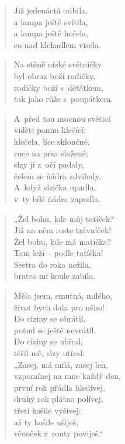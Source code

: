 \begin{verse}
Již jedenáctá odbila, \\
a lampa ještě svítila, \\
a lampa ještě hořela, \\
co nad klekadlem visela.
\end{verse}

\begin{verse}
Na stěně nízké světničky \\
byl obraz boží rodičky, \\
rodičky boží s~děťátkem, \\
tak jako růže s~poupátkem.
\end{verse}

\begin{verse}
A~před tou mocnou světicí \\
viděti pannu klečící: \\
klečela, líce skloněné, \\
ruce na prsa složené; \\
slzy jí z~očí padaly, \\
čelem se ňádra zdvihaly. \\
A~když slzička upadla, \\
v~ty bílé ňádra zapadla.
\end{verse}

\begin{verse}
„Žel bohu, kde můj tatíček? \\
Již na něm roste trávníček! \\
Žel bohu, kde má matička? \\
Tam leží -- podle tatíčka! \\
Sestra do roka nežila, \\
bratra mi koule zabila.
\end{verse}

\begin{verse}
Měla jsem, smutná, milého, \\
život bych dala pro něho! \\
Do ciziny se obrátil, \\
potud se ještě nevrátil. \\
Do ciziny se ubíral, \\
těšil mě, slzy utíral: \\
„Zasej, má milá, zasej len, \\
vzpomínej na mne každý den, \\
první rok přádla hledívej, \\
druhý rok plátno polívej, \\
třetí košile vyšívej: \\
až ty košile ušiješ, \\
věneček z~routy poviješ.“
\end{verse}

